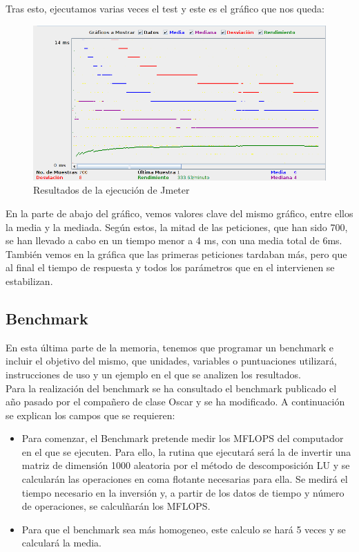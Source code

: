 \begin{itemize}
\begin{itemize}
		Tras esto, ejecutamos varias veces el test y este es el gráfico que nos queda:\\
		
		\begin{figure}[H]
			\centering
			\includegraphics[width=0.7\linewidth]{GraficoJmeter}
			\caption[Grafico Jmeter]{Resultados de la ejecución de Jmeter}
			\label{fig:GraficoJmeter}
		\end{figure}
		
		En la parte de abajo del gráfico, vemos valores clave del mismo gráfico, entre ellos la media y la mediada. Según estos, la mitad de las peticiones, que han sido 700, se han llevado a cabo en un tiempo menor a 4 ms, con una media total de 6ms. También vemos en la gráfica que las primeras peticiones tardaban más, pero que al final el tiempo de respuesta y todos los parámetros que en el intervienen se estabilizan.

	\end{itemize}
	
	\subsection{Benchmark}
	En esta última parte de la memoria, tenemos que programar un benchmark e incluir el objetivo del mismo, que unidades, variables o puntuaciones utilizará, instrucciones de uso y un ejemplo en el que se analizen los resultados.\\
	
	Para la realización del benchmark se ha consultado el benchmark publicado el año pasado por el compañero de clase Oscar \cite{oscar} y se ha modificado. A continuación se explican los campos que se requieren:\\
	
	\begin{itemize}
		\item Para comenzar, el Benchmark pretende medir los MFLOPS del computador en el que se ejecuten. Para ello, la rutina que ejecutará será la de invertir una matriz de dimensión 1000 aleatoria por el método de descomposición LU y se calcularán las operaciones en coma flotante necesarias para ella. Se medirá el tiempo necesario en la inversión y, a partir de los datos de tiempo y número de operaciones, se calculñarán los MFLOPS.
		\item Para que el benchmark sea más homogeneo, este calculo se hará 5 veces y se calculará la media. 
		

\end{itemize}
\end{itemize}
